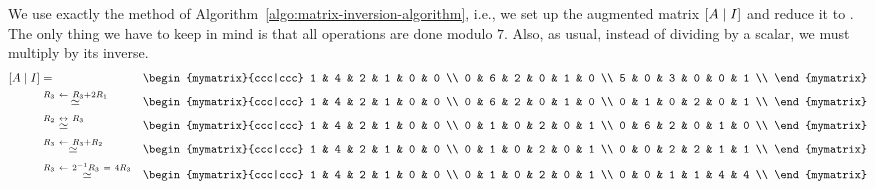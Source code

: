 \begin{solution}
  We use exactly the method of
  Algorithm~\ref{algo:matrix-inversion-algorithm}, i.e., we set up the
  augmented matrix $\left[A\mid I\right]$ and reduce it to {\rref}. The only
  thing we have to keep in mind is that all operations are done modulo
  $7$. Also, as usual, instead of dividing by a scalar, we must
  multiply by its inverse.
  \begin{eqnarray*}
    \mat{A\mid I}
    &=&
        \begin{mymatrix}{ccc|ccc}
          1 & 4 & 2  &  1 & 0 & 0 \\
          0 & 6 & 2  &  0 & 1 & 0 \\
          5 & 0 & 3  &  0 & 0 & 1 \\
        \end{mymatrix}
    \\
    &\stackrel{R_3\rowop R_3+2R_1}{\roweq}
      &
        \begin{mymatrix}{ccc|ccc}
          1 & 4 & 2  &  1 & 0 & 0 \\
          0 & 6 & 2  &  0 & 1 & 0 \\
          0 & 1 & 0  &  2 & 0 & 1 \\
        \end{mymatrix}
    \\
    &\stackrel{R_2\rowswap R_3}{\roweq}
      &
        \begin{mymatrix}{ccc|ccc}
          1 & 4 & 2  &  1 & 0 & 0 \\
          0 & 1 & 0  &  2 & 0 & 1 \\
          0 & 6 & 2  &  0 & 1 & 0 \\
        \end{mymatrix}
    \\
    &\stackrel{R_3\rowop R_3+R_2}{\roweq}
      &
        \begin{mymatrix}{ccc|ccc}
          1 & 4 & 2  &  1 & 0 & 0 \\
          0 & 1 & 0  &  2 & 0 & 1 \\
          0 & 0 & 2  &  2 & 1 & 1 \\
        \end{mymatrix}
    \\
    &\stackrel{R_3\rowop 2^{-1}R_3 ~=~ 4R_3}{\roweq}
      &
        \begin{mymatrix}{ccc|ccc}
          1 & 4 & 2  &  1 & 0 & 0 \\
          0 & 1 & 0  &  2 & 0 & 1 \\
          0 & 0 & 1  &  1 & 4 & 4 \\

\end{mymatrix}
\end{eqnarray*}
\end{solution}
